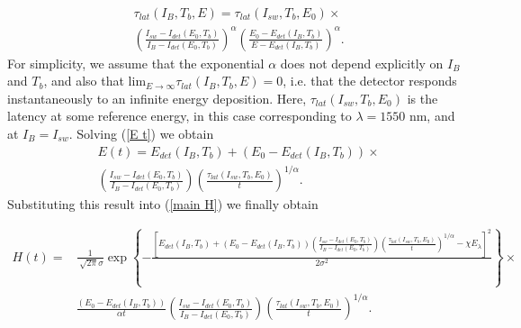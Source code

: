 \documentclass[%
reprint,
 amsmath,amssymb,
aps,
pra,
]{revtex4-1}
\begin{document}
\begin{equation}\label{comb appr tau lat}
\begin{aligned}
&\tau_{lat}\left(I_B,T_b,E\right) = \tau_{lat}\left(I_{sw},T_b,E_0\right)\times\\
&\left(\frac{I_{sw}-I_{det}\left(E_0,T_b\right)}{I_B-I_{det}\left(E_0,T_b\right)}\right)^\alpha \left(\frac{E_0-E_{det}\left(I_B,T_b\right)}{E-E_{det}\left(I_B,T_b\right)}\right)^\alpha .
\end{aligned}
\end{equation}
For simplicity, we assume that the exponential \(\alpha\) does not depend explicitly on \(I_B\) and \(T_b\), and also that
\(\text{lim}_{E\rightarrow \infty} \tau_{lat}\left(I_B, T_b, E\right) = 0 \), i.e. that the detector responds instantaneously to an infinite energy deposition. Here, 
\(\tau_{lat}\left(I_{sw}, T_b, E_0\right) \)
is the latency at some reference energy, in this case corresponding to \(\lambda = 1550 \text{ nm}\), and at $I_B=I_{sw}$. Solving (\ref{E t}) we obtain
\begin{equation}\label{E(t)}
\begin{aligned}
&E\left(t\right) = E_{det}\left(I_B,T_b\right) + \left(E_0 - E_{det}\left(I_B,T_b\right)\right)\times\\
&\left(\frac{I_{sw} - I_{det}\left(E_0,T_b\right)}{I_B - I_{det}\left(E_0,T_b\right)}\right)\left(\frac{\tau_{lat}\left(I_{sw},T_b,E_0\right)}{t}\right)^{1/\alpha} \text{.}
\end{aligned}
\end{equation}
Substituting this result into (\ref{main H}) we finally obtain
\begin{widetext}
\begin{equation}\label{Simple HB H}
\begin{aligned}
H\left(t\right) ={}& \frac{1}{\sqrt[]{2\pi}\sigma} \exp \left\lbrace - \frac{\left[E_{det}\left(I_B,T_b\right) + \left(E_0 - E_{det}\left(I_B,T_b\right)\right)\left(\frac{I_{sw} - I_{det}\left(E_0,T_b\right)}{I_B - I_{det}\left(E_0,T_b\right)}\right)\left(\frac{\tau_{lat}\left(I_{sw},T_b,E_0\right)}{t}\right)^{1/\alpha} - \chi E_\lambda \right]^2 }{2 \sigma^2} \right\rbrace \times \\
&\frac{\left(E_0 - E_{det}\left(I_B,T_b\right)\right)}{\alpha t}\left(\frac{I_{sw} - I_{det}\left(E_0,T_b\right)}{I_B - I_{det}\left(E_0,T_b\right)}\right)\left(\frac{\tau_{lat}\left(I_{sw},T_b,E_0\right)}{t}\right)^{1/\alpha} \text{.}
\end{aligned}     
\end{equation}
\end{widetext}
\end{document}
